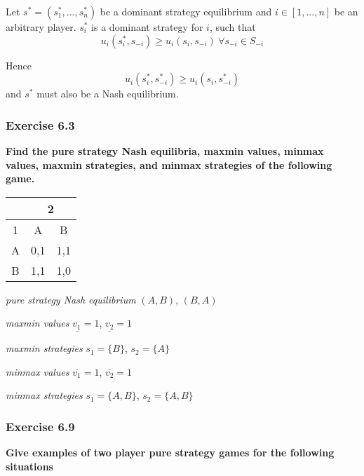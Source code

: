 \documentclass[12pt, a4paper]{article}
\begin{document}
	Let $s^* = (s_1^*, ..., s_n^*)$ be a dominant strategy equilibrium and $i\in [1,...,n]$ be an arbitrary player. $s_i^*$ is a dominant strategy for $i$, such that
	\[ u_i(s_i^*, s_{-i}) \geq u_i(s_i,s_{-i})\ \forall s_{-i}\in S_{-i} \]
	
	Hence
	\[ u_i(s_i^*, s_{-i}^*) \geq u_i(s_i, s_{-i}^*) \]
	and $s^*$ must also be a Nash equilibrium.
	
	\subsubsection*{Exercise 6.3}

	\textbf{Find the pure strategy Nash equilibria, maxmin values, minmax values, maxmin strategies, and minmax strategies of the following game.}
	
	\begin{table}[ht!]
		\centering
		\begin{tabular}{|c|c|c|} \hline
			& \multicolumn{2}{|c|}{2} \\ \hline
			1 & A & B \\ \hline
			A & 0,1 & 1,1 \\ \hline
			B & 1,1 & 1,0 \\ \hline
		\end{tabular}
	\end{table}
	
	\textit{pure strategy Nash equilibrium} $(A,B)$, $(B,A)$
	
	\textit{maxmin values} $\underline{v_1}=1$, $\underline{v_2}=1$
	
	\textit{maxmin strategies} $s_1=\{B\}$, $s_2=\{A\}$
	
	\textit{minmax values} $\overline{v_1}=1$, $\overline{v_2}=1$
	
	\textit{minmax strategies} $s_1=\{A, B\}$, $s_2=\{A,B\}$
	
	
	\subsubsection*{Exercise 6.9}
	
	\textbf{Give examples of two player pure strategy games for the following situations}
	
\end{document}
